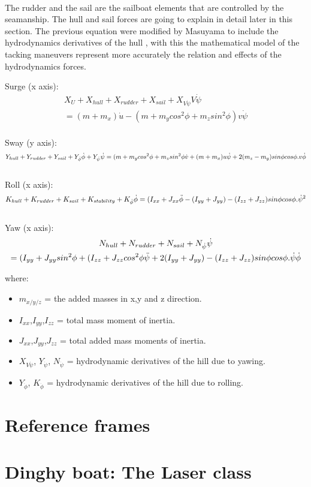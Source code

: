 \\ 
The rudder and the sail are the sailboat elements that are controlled by the seamanship. The hull and sail forces are going to explain in detail later in this section. The previous equation were modified by Masuyama to include the hydrodynamics derivatives of the hull \cite{masuyama2011tacking}, with this \cite{de2004mathematical} the mathematical model of the tacking maneuvers represent more accurately the relation and effects of the hydrodynamics forces.

Surge  (x axis):
\begin{multline}\label{eq:force_xMasuyama}
    X_{U}+X_{hull}+X_{rudder}+X_{sail}+X_{V\Dot{\psi}}V\Dot{\psi}\\ =(m+m_{x})\Dot{u}-(m+m_{y}cos^2\phi+m_{z}sin^2\phi)v\Dot{\psi}
\end{multline}
\\
Sway  (y axis):
\begin{equation}
     Y_{hull}+Y_{rudder}+Y_{sail}+Y_{\Dot{\phi}} \Dot{\phi} + Y_{\Dot{\psi}} \Dot{\psi} \\
    =(m+m_{y}cos^2 \phi + m_{z} sin^2 \phi \Dot{v} + (m+m_{x})u \Dot{\psi} + 2(m_{z}-m_{y})sin\phi cos\phi . v \Dot{\phi}
\end{equation} \label{eq:force_yMasuyama}
\\
Roll (x axis):
\begin{equation}  \label{eq:m_xMasuyama}
   K_{hull}+K_{rudder}+K_{sail}+K_{stability}+K_{\Dot{\phi}} \Dot{\phi} \\
 =(I_{xx} + J_{xx} \Ddot{\phi} - {(I_{yy} + J_{yy})-(I_{zz} + J_{zz})} sin\phi cos\phi . \Dot{\psi}^2   
\end{equation}
\\
Yaw (x axis):
\begin{multline}
   N_{hull}+N_{rudder}+N_{sail}+N_{\Dot{\psi}}\Dot{\psi}\\
 ={(I_{yy} + J_{yy}sin^2 \phi +(I_{zz} + J_{zz}cos^2 \phi}\Ddot{\psi} +2{(I_{yy} + J_{yy})-(I_{zz} + J_{zz})}sin\phi cos\phi . \Dot{\psi} \Dot{\phi}  
\end{multline}\label{eq:m_yMasuyama}

where: 
\begin{itemize}  \label{symbols_motions2}
 \setlength \itemsep{0em}
\item $m_{x/y/z}$ = the added masses in x,y and z direction.
\item $I_{xx}$,$I_{yy}$,$I_{zz}$ = total mass moment of inertia.
\item $J_{xx}$,$J_{yy}$,$J_{zz}$ = total added mass moments of inertia.
\item $X_{V\Dot{\psi}}$, $Y_{\Dot{\psi}}$, $N_{\Dot{\psi}}$  = hydrodynamic derivatives of the hill due to yawing.
\item $Y_{\Dot{\phi}}$, $K_{\Dot{\phi}}$  = hydrodynamic derivatives of the hill due to rolling.
\end{itemize}




\section{Reference frames}
\section{Dinghy boat: The Laser class}